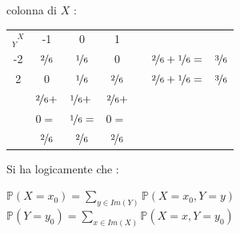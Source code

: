 \documentclass[12pt, letterpaper]{article}
\newcommand{\Prob}{{\mathbb P}}
\begin{document}
colonna di \(X\) : \begin{center}
    \begin{tabular}{lccclll}
        \cline{1-4}
        \multicolumn{1}{|c|}{\cellcolor[HTML]{C0C0C0}\(\text{}^{\text{ }X}_Y\)} & \multicolumn{1}{c|}{\cellcolor[HTML]{FD6864}-1} & \multicolumn{1}{c|}{\cellcolor[HTML]{FD6864}0} & \multicolumn{1}{c|}{\cellcolor[HTML]{FD6864}1} &  &                       &                          \\ \cline{1-4} \cline{7-7} 
        \multicolumn{1}{|c|}{\cellcolor[HTML]{9698ED}-2} & \multicolumn{1}{c|}{\(\nicefrac{2}{6}\)}                        & \multicolumn{1}{c|}{\(\nicefrac{1}{6}\)}                       & \multicolumn{1}{c|}{0}                         &  & \multicolumn{1}{l|}{\(\nicefrac{2}{6}+\nicefrac{1}{6}=\)} & \multicolumn{1}{c|}{\(\nicefrac{3}{6}\)} \\ \cline{1-4} \cline{7-7} 
        \multicolumn{1}{|c|}{\cellcolor[HTML]{9698ED}2}  & \multicolumn{1}{c|}{0}                          & \multicolumn{1}{c|}{\(\nicefrac{1}{6}\)}                       & \multicolumn{1}{c|}{\(\nicefrac{2}{6}\)}                       &  & \multicolumn{1}{l|}{\(\nicefrac{2}{6}+\nicefrac{1}{6}=\)} & \multicolumn{1}{c|}{\(\nicefrac{3}{6}\)} \\ \cline{1-4} \cline{7-7} 
                                                         & \multicolumn{1}{l}{\(\nicefrac{2}{6}+\)}                            & \multicolumn{1}{l}{\(\nicefrac{1}{6}+\)}                           & \multicolumn{1}{l}{\(\nicefrac{2}{6}+\)}                           &  &                       &                          \\
                                                         & \multicolumn{1}{l}{\(0=\)}                            & \multicolumn{1}{l}{\(\nicefrac{1}{6}=\)}                           & \multicolumn{1}{l}{\(0=\)}                           &  &                       &                          \\ \cline{2-4}
        \multicolumn{1}{l|}{}                            & \multicolumn{1}{c|}{\(\nicefrac{2}{6}\)}                        & \multicolumn{1}{c|}{\(\nicefrac{2}{6}\)}                       & \multicolumn{1}{c|}{\(\nicefrac{2}{6}\)}                       &  &                       &                          \\ \cline{2-4}
        \end{tabular}
\end{center}
Si ha logicamente che : \begin{center}
    \(\Prob(X=x_0)=\displaystyle\sum_{y\in Im(Y)}\Prob(X=x_0,Y=y)\)\hphantom{aaaa}
    \(\Prob(Y=y_0)=\displaystyle\sum_{x\in Im(X)}\Prob(X=x,Y=y_0)\)
\end{center}
\end{document}
